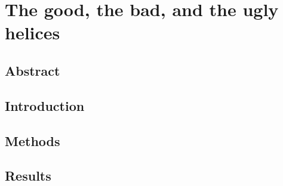 
\chapter{The good, the bad, and the ugly helices} %
\section{Abstract}
\section{Introduction}
\section{Methods}
\section{Results}
